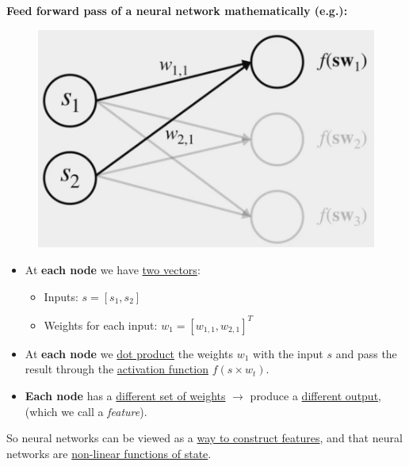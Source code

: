 \documentclass[12pt, a4paper]{article}
\begin{document}
\textbf{Feed forward pass of a neural network mathematically (e.g.):}
\begin{figure}[H]
  \centering
    \includegraphics[width=0.7\columnwidth]{images/ann-feed-forward.png}
    \label{fig:ann-feed-forward}
\end{figure}
\begin{itemize}
  \item At \textbf{each node} we have \uline{two vectors}:
  \begin{itemize}
    \item Inputs: $s = [s_1, s_2]$
    \item Weights for each input: $w_1 = [w_{1,1}, w_{2,1}]^T$
  \end{itemize}
  \item At \textbf{each node} we \uline{dot product} the weights $w_1$ with the input $s$ and pass the result through the \uline{activation function} $f(s \times w_t)$.
  \item \textbf{Each node} has a \uline{different set of weights} $\rightarrow$ produce a \uline{different output}, (which we call a \textit{feature}).
\end{itemize}

So neural networks can be viewed as a \uline{way to construct features}, and that neural networks are \uline{non-linear functions of state}.
\end{document}
